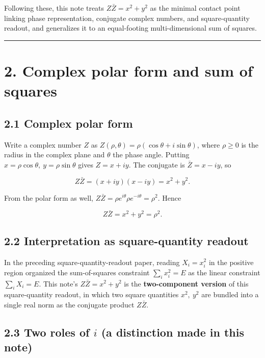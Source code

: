 \documentclass[11pt,a4paper]{article}
\begin{document}
Following these, this note treats \(Z\bar Z=x^2+y^2\) as the minimal
contact point linking phase representation, conjugate complex numbers,
and square-quantity readout, and generalizes it to an equal-footing
multi-dimensional sum of squares.

\begin{center}\rule{0.5\linewidth}{0.5pt}\end{center}

\section{2. Complex polar form and sum of
squares}\label{complex-polar-form-and-sum-of-squares}

\subsection{2.1 Complex polar form}\label{complex-polar-form}

Write a complex number \(Z\) as
\(Z(\rho,\theta)=\rho(\cos\theta+i\sin\theta)\), where \(\rho\ge0\) is
the radius in the complex plane and \(\theta\) the phase angle. Putting
\(x=\rho\cos\theta,\ y=\rho\sin\theta\) gives \(Z=x+iy\). The conjugate
is \(\bar Z=x-iy\), so

\[
Z\bar Z=(x+iy)(x-iy)=x^2+y^2 .
\]

From the polar form as well,
\(Z\bar Z=\rho e^{i\theta}\rho e^{-i\theta}=\rho^2\). Hence

\[
Z\bar Z=x^2+y^2=\rho^2 .
\]

\subsection{2.2 Interpretation as square-quantity
readout}\label{interpretation-as-square-quantity-readout}

In the preceding square-quantity-readout paper, reading \(X_i=x_i^2\) in
the positive region organized the sum-of-squares constraint
\(\sum_i x_i^2=E\) as the linear constraint \(\sum_i X_i=E\). This
note's \(Z\bar Z=x^2+y^2\) is the \textbf{two-component version} of this
square-quantity readout, in which two square quantities \(x^2,\ y^2\)
are bundled into a single real norm as the conjugate product
\(Z\bar Z\).

\subsection{\texorpdfstring{2.3 Two roles of \(i\) (a distinction made
in this
note)}{2.3 Two roles of i (a distinction made in this note)}}\label{two-roles-of-i-a-distinction-made-in-this-note}
\end{document}
